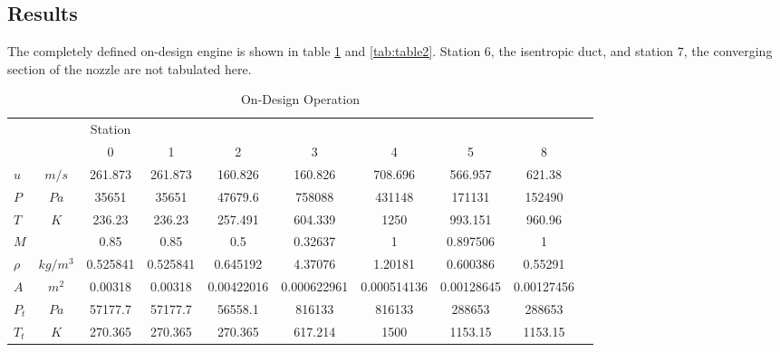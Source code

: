 \documentclass[journal ]{new-aiaa}
\begin{document}
\subsection{Results}
The completely defined on-design engine is shown in table \ref{tab:table1} and \ref{tab:table2}. 
Station 6, the isentropic duct, and station 7, the converging section of the nozzle are not tabulated here.

\begin{table}[hbt!]
    \caption{\label{tab:table1} On-Design Operation}
    \centering
    \begin{tabular}{lccccccccc}
    \hline
    & &Station& & \multicolumn{1}{c}{}\\\cline{3-9}
    & &                   0&    1&    2&    3&     4&     5&     8\\ \hline
    
    
    $u$ & $m/s$&        261.873&	261.873&	160.826&	160.826&	708.696&	566.957&	621.38\\     
    
    $P$ & $Pa$&         35651&	35651&	47679.6&	758088&	431148&	171131&	152490\\  
    
    $T$ & $K$&          236.23&	236.23&	257.491&	604.339&	1250&	993.151&	960.96\\ 
    
    $M$& &              0.85&	0.85&	0.5&	0.32637&	1&	0.897506&	1\\          
    
    $\rho$ & $kg/m^3$&  0.525841&	0.525841&	0.645192&	4.37076&	1.20181&	0.600386&	0.55291\\
    
    $A$ & $m^2$&        0.00318&	0.00318&	0.00422016&	0.000622961&	0.000514136&	0.00128645&	0.00127456\\
    
    $P_t$ & $Pa$&       57177.7&	57177.7&	56558.1&	816133&	816133&	288653&	288653\\
    
    $T_t$ & $K$&        270.365&	270.365&	270.365&	617.214&	1500&	1153.15&	1153.15\\  
    
        \hline
        \end{tabular}
        \end{table}
\end{document}
